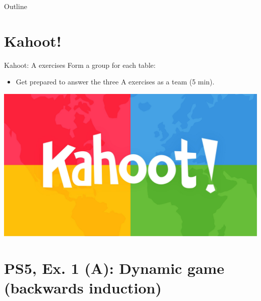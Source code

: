 

\maketitle

  \newcommand{\intuition}[1]{#1} %


\begin{frame}{Outline}
    \tableofcontents
\end{frame}



\section{Kahoot!}

\begin{frame}{Kahoot: A exercises}
  Form a group for each table:
  \begin{itemize}
    \item Get prepared to answer the three A exercises as a team (5 min).
  \end{itemize}
  \includegraphics[width=\textwidth]{figures/kahoot}
\end{frame}



\section{PS5, Ex. 1 (A): Dynamic game (backwards induction)}


